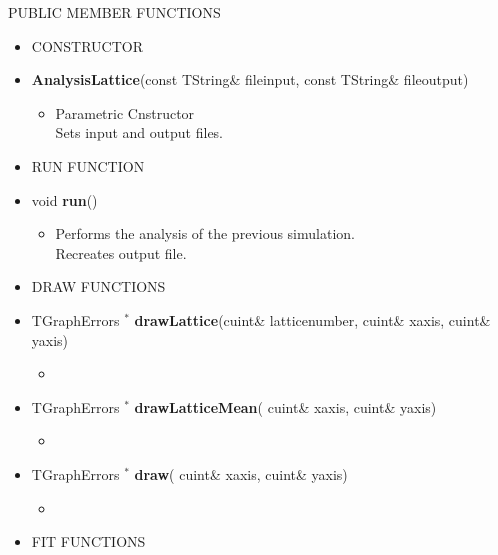 \item[] PUBLIC MEMBER FUNCTIONS \\
  \begin{itemize}
  \item[] CONSTRUCTOR \\

  \item[] \textbf{AnalysisLattice}(const TString\& file\textunderscore input, const TString\& file\textunderscore output)
    \begin{itemize}
    \item[] Parametric Cnstructor\\
      Sets input and output files.
    \end{itemize}

  \item[] RUN FUNCTION

  \item[] void \textbf{run}()
    \begin{itemize}
    \item[] Performs the analysis of the previous simulation.\\
      Recreates output file.
    \end{itemize}

  \item[] DRAW FUNCTIONS

  \item[]       TGraphErrors ${}^*$ \textbf{drawLattice}(cuint\& lattice\textunderscore number,
    cuint\& x\textunderscore axis,
    cuint\& y\textunderscore axis)
    \begin{itemize}
    \item[]
    \end{itemize}

  \item[] TGraphErrors ${}^*$ \textbf{drawLatticeMean}(
    cuint\& x\textunderscore axis,
    cuint\& y\textunderscore axis)
    \begin{itemize}
    \item[]
    \end{itemize}

  \item[] TGraphErrors ${}^*$ \textbf{draw}(
    cuint\& x\textunderscore axis,
    cuint\& y\textunderscore axis)
    \begin{itemize}
    \item[] 
    \end{itemize}


  \item[] FIT FUNCTIONS \\


\end{itemize}
